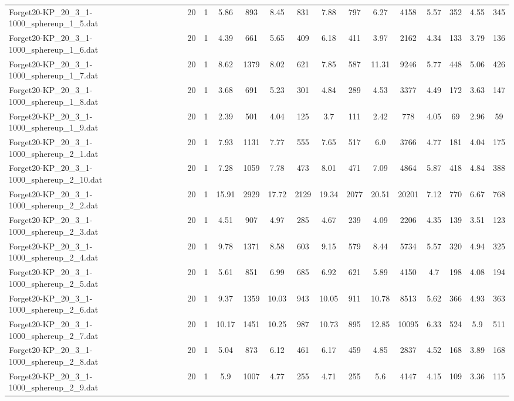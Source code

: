 \begin{table}[!ht]
{\begin{tabular}{lcccccccccccccc}
Forget20-KP\_20\_3\_1-1000\_sphereup\_1\_5.dat & 20 & 1 & 5.86 & 893 & 8.45 & 831 & 7.88 & 797 & 6.27 & 4158 & 5.57 & 352 & 4.55 & 345 \\
Forget20-KP\_20\_3\_1-1000\_sphereup\_1\_6.dat & 20 & 1 & 4.39 & 661 & 5.65 & 409 & 6.18 & 411 & 3.97 & 2162 & 4.34 & 133 & 3.79 & 136 \\
Forget20-KP\_20\_3\_1-1000\_sphereup\_1\_7.dat & 20 & 1 & 8.62 & 1379 & 8.02 & 621 & 7.85 & 587 & 11.31 & 9246 & 5.77 & 448 & 5.06 & 426 \\
Forget20-KP\_20\_3\_1-1000\_sphereup\_1\_8.dat & 20 & 1 & 3.68 & 691 & 5.23 & 301 & 4.84 & 289 & 4.53 & 3377 & 4.49 & 172 & 3.63 & 147 \\
Forget20-KP\_20\_3\_1-1000\_sphereup\_1\_9.dat & 20 & 1 & 2.39 & 501 & 4.04 & 125 & 3.7 & 111 & 2.42 & 778 & 4.05 & 69 & 2.96 & 59 \\
Forget20-KP\_20\_3\_1-1000\_sphereup\_2\_1.dat & 20 & 1 & 7.93 & 1131 & 7.77 & 555 & 7.65 & 517 & 6.0 & 3766 & 4.77 & 181 & 4.04 & 175 \\
Forget20-KP\_20\_3\_1-1000\_sphereup\_2\_10.dat & 20 & 1 & 7.28 & 1059 & 7.78 & 473 & 8.01 & 471 & 7.09 & 4864 & 5.87 & 418 & 4.84 & 388 \\
Forget20-KP\_20\_3\_1-1000\_sphereup\_2\_2.dat & 20 & 1 & 15.91 & 2929 & 17.72 & 2129 & 19.34 & 2077 & 20.51 & 20201 & 7.12 & 770 & 6.67 & 768 \\
Forget20-KP\_20\_3\_1-1000\_sphereup\_2\_3.dat & 20 & 1 & 4.51 & 907 & 4.97 & 285 & 4.67 & 239 & 4.09 & 2206 & 4.35 & 139 & 3.51 & 123 \\
Forget20-KP\_20\_3\_1-1000\_sphereup\_2\_4.dat & 20 & 1 & 9.78 & 1371 & 8.58 & 603 & 9.15 & 579 & 8.44 & 5734 & 5.57 & 320 & 4.94 & 325 \\
Forget20-KP\_20\_3\_1-1000\_sphereup\_2\_5.dat & 20 & 1 & 5.61 & 851 & 6.99 & 685 & 6.92 & 621 & 5.89 & 4150 & 4.7 & 198 & 4.08 & 194 \\
Forget20-KP\_20\_3\_1-1000\_sphereup\_2\_6.dat & 20 & 1 & 9.37 & 1359 & 10.03 & 943 & 10.05 & 911 & 10.78 & 8513 & 5.62 & 366 & 4.93 & 363 \\
Forget20-KP\_20\_3\_1-1000\_sphereup\_2\_7.dat & 20 & 1 & 10.17 & 1451 & 10.25 & 987 & 10.73 & 895 & 12.85 & 10095 & 6.33 & 524 & 5.9 & 511 \\
Forget20-KP\_20\_3\_1-1000\_sphereup\_2\_8.dat & 20 & 1 & 5.04 & 873 & 6.12 & 461 & 6.17 & 459 & 4.85 & 2837 & 4.52 & 168 & 3.89 & 168 \\
Forget20-KP\_20\_3\_1-1000\_sphereup\_2\_9.dat & 20 & 1 & 5.9 & 1007 & 4.77 & 255 & 4.71 & 255 & 5.6 & 4147 & 4.15 & 109 & 3.36 & 115 \\

\end{tabular}}
\end{table}
